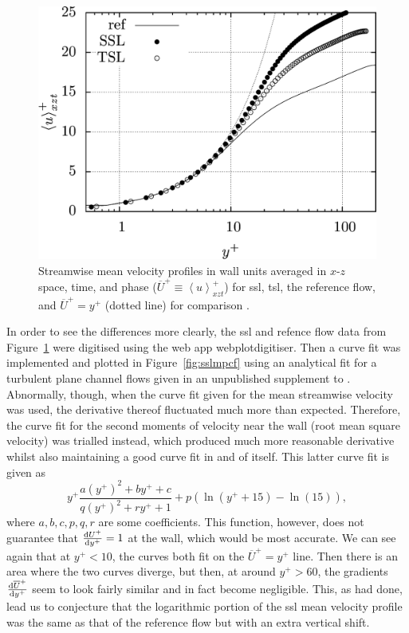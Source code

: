 \begin{figure}[htbp]
	\centering
	\includegraphics[width=0.7\linewidth]{project/fig/sslmeanprofile.png}
	\caption[Streamwise mean velocity profiles of SSL and reference flow]{Streamwise mean velocity profiles in wall units averaged in $x$-$z$ space, time, and phase ($\overline{U}^{+}\equiv \left<u \right>^{+}_{xzt}$) for \gls{ssl}, \gls{tsl}, the reference flow, and $\overline{U}^{+}=y^{+}$ (dotted line) for comparison \cite{viotti2009}.}
	\label{fig:sslmeanprofile}
\end{figure}

In order to see the differences more clearly, the  \gls{ssl} and refence flow data from Figure~\ref{fig:sslmeanprofile} were digitised using the web app webplotdigitiser. Then a curve fit was implemented and plotted in Figure~\ref{fig:sslmpcf} using an analytical fit for a turbulent plane channel flows given in an unpublished supplement to \cite{chernyshenko2021}. Abnormally, though, when the curve fit given for the mean streamwise velocity was used, the derivative thereof fluctuated much more than expected. Therefore, the curve fit for the second moments of velocity near the wall (root mean square velocity) was trialled instead, which produced much more reasonable derivative whilst also maintaining a good curve fit in and of itself. This latter curve fit is given as
\begin{equation}
	y^{+}  \frac{a\left(y^{+}\right)^2 + by^{+} + c}{q\left(y^{+}\right)^2 + ry^{+} + 1} + p \left( \ln(y^{+}+15)-\ln(15)\right)\label{eq:curvefit}
,\end{equation}
where $a,b,c,p,q,r$ are some coefficients. This function, however, does not guarantee that $\dv{U^{+}}{y^{+}} =1$ at the wall, which would be most accurate. We can see again that at $y^{+}<10$, the curves both fit on the $\overline{U}^{+}=y^{+}$ line. Then there is an area where the two curves diverge, but then, at around $y^{+}>60$, the gradients $\dv{\overline{U}^{+}}{y^{+}} $ seem to look fairly similar and in fact become negligible. This, as \textcite{viotti2009} had done, lead us to conjecture that the logarithmic portion of the \gls{ssl} mean velocity profile was the same as that of the reference flow but with an extra vertical shift.

